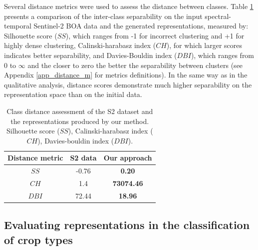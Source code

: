 \documentclass[journal,article,submit,pdftex,moreauthors]{Definitions/mdpi}
\begin{document}
Several distance metrics were used to assess the distance between classes. Table \ref{distance_metrics_results} presents a comparison of the inter-class separability on the input spectral-temporal Sentinel-2 BOA data and the generated representations, measured by: Silhouette score ($SS$), which ranges from -1 for incorrect clustering and +1 for highly dense clustering, Calinski-harabasz index ($CH$), for which larger scores indicates better separability, and Davies-Bouldin index ($DBI$), which ranges from 0 to $\infty$ and the closer to zero the better the separability between clusters (see Appendix \ref{app_distance_m} for metrics definitions).
In the same way as in the qualitative analysis, distance scores demonstrate much higher separability on the representation space than on the initial data.
\begin{table}[H]
	\centering
	\caption{Class distance assessment of the S2 dataset and the representations produced by our method. Silhouette score ($SS$), Calinski-harabasz index ($CH$), Davies-bouldin index ($DBI$).}
	\begin{tabular}{c|c|c}
		\hline
		Distance metric & S2 data & Our approach \\
		\hline  	
		$SS$ & -0.76 & \textbf{0.20} \\
        $CH$ & 1.4 & \textbf{73074.46} \\
		$DBI$ & 72.44  & \textbf{18.96} \\ 
		\hline
	\end{tabular}
	\label{distance_metrics_results}
\end{table}

\subsection{Evaluating representations in the classification of crop types}\label{results_section}
\end{document}
